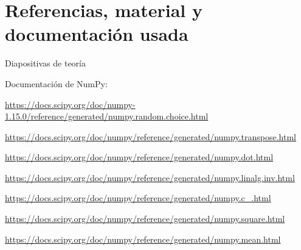\documentclass[12pt, spanish]{article}
\begin{document}
\newpage

\section{Referencias, material y documentación usada}


\begin{thebibliography}{9}

Diapositivas de teoría

Documentación de NumPy:

\url{https://docs.scipy.org/doc/numpy-1.15.0/reference/generated/numpy.random.choice.html}

\url{https://docs.scipy.org/doc/numpy/reference/generated/numpy.transpose.html}

\url{https://docs.scipy.org/doc/numpy/reference/generated/numpy.dot.html}

\url{https://docs.scipy.org/doc/numpy/reference/generated/numpy.linalg.inv.html}

\url{https://docs.scipy.org/doc/numpy/reference/generated/numpy.c_.html}

\url{https://docs.scipy.org/doc/numpy/reference/generated/numpy.square.html}

\url{https://docs.scipy.org/doc/numpy/reference/generated/numpy.mean.html}


\end{thebibliography}
\end{document}
